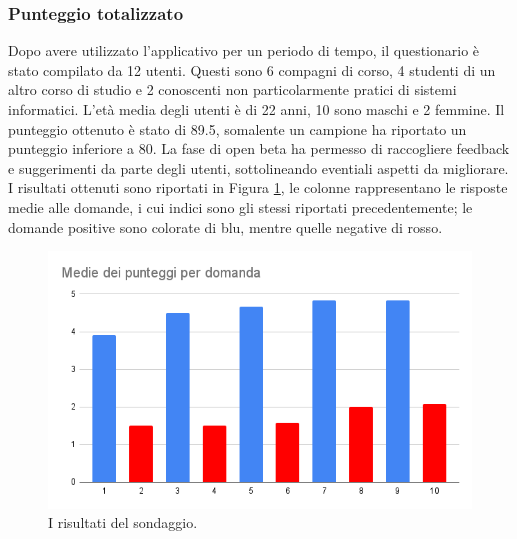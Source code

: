 \subsubsection{Punteggio totalizzato}
Dopo avere utilizzato l'applicativo per un periodo di tempo, il questionario è stato compilato da 12 utenti.
Questi sono 6 compagni di corso, 4 studenti di un altro corso di studio e 2 conoscenti non particolarmente pratici di sistemi informatici.
L'età media degli utenti è di 22 anni, 10 sono maschi e 2 femmine.
Il punteggio ottenuto è stato di 89.5, somalente un campione ha riportato un punteggio inferiore a 80.
La fase di open beta ha permesso di raccogliere feedback e suggerimenti da parte degli utenti, sottolineando eventiali aspetti da migliorare.
I risultati ottenuti sono riportati in Figura \ref{fig:result}, le colonne rappresentano le risposte medie alle domande, i cui indici sono gli stessi riportati precedentemente; le domande positive sono colorate di blu, mentre quelle negative di rosso.

\begin{figure}[h]
  \includegraphics[width=\linewidth]{img/media.png}
  \caption{I risultati del sondaggio.}
  \label{fig:result}
\end{figure}
